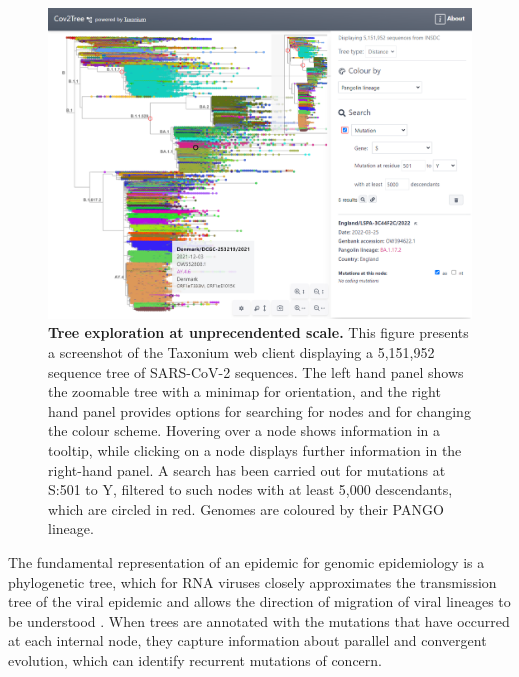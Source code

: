 \begin{figure}

\begin{center}
\includegraphics[width=\linewidth]{Figures/cov2tree.png}
\end{center}
\caption{\textbf{Tree exploration at unprecendented scale.} This figure presents a screenshot of the Taxonium web client displaying a 5,151,952 sequence tree of SARS-CoV-2 sequences. The left hand panel shows the zoomable tree with a minimap for orientation, and the right hand panel provides options for searching for nodes and for changing the colour scheme. Hovering over a node shows information in a tooltip, while clicking on a node displays further information in the right-hand panel. A search has been carried out for mutations at S:501 to Y, filtered to such nodes with at least 5,000 descendants, which are circled in red. Genomes are coloured by their PANGO lineage.}
\label{fig:taxonium_client}
\end{figure}

The fundamental representation of an epidemic for genomic epidemiology is a phylogenetic tree, which for RNA viruses closely approximates the transmission tree of the viral epidemic and allows the direction of migration of viral lineages to be understood \citep{pmid27501264}. When trees are annotated with the mutations that have occurred at each internal node, they capture information about parallel and convergent evolution, which can identify recurrent mutations of concern.

